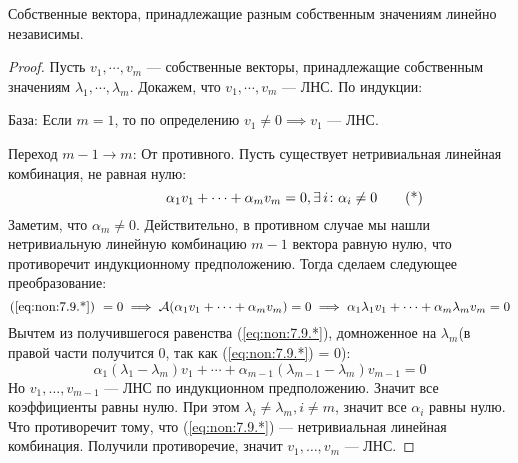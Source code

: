 \documentclass[../main.tex]{subfiles}
\begin{document}
\begin{theorem-non}
\label{non:7.9}
  Собственные вектора, принадлежащие разным собственным значениям линейно независимы.
\end{theorem-non}
\begin{proof}
  Пусть $v_1, \dotsb, v_m$ --- собственные векторы, принадлежащие собственным значениям $\lambda_1, \dotsb, \lambda_m$. Докажем, что $v_1, \dotsb, v_m$ --- ЛНС. По индукции:

  База: Если $m = 1$, то по определению $v_1 \neq 0 \implies v_1$ --- ЛНС.

  Переход $m - 1 \to m$: От противного. Пусть существует нетривиальная линейная комбинация, не равная нулю:
  \begin{equation}
  \hphantom{, \exists\, i\colon \alpha_i \neq 0}
    \alpha_1 v_1 + \dotsb + \alpha_m v_m = 0, \exists\, i\colon \alpha_i \neq 0
    \tag{*}
    \label{eq:non:7.9.*}
  \end{equation}
  Заметим, что $\alpha_m \neq 0$. Действительно, в противном случае мы нашли нетривиальную линейную комбинацию $m - 1$ вектора равную нулю, что противоречит индукционному предположению. Тогда сделаем следующее преобразование:
  \begin{equation*}
    \text{(\ref{eq:non:7.9.*}) }= 0
    \implies
    \mathcal{A}(\alpha_1 v_1 + \dotsb + \alpha_m v_m) = 0
    \implies
    \alpha_1 \lambda_1 v_1 + \dotsb + \alpha_m \lambda_m v_m = 0
  \end{equation*}
  Вычтем из получившегося равенства (\ref{eq:non:7.9.*}), домноженное на $\lambda_m$(в правой части получится 0, так как (\ref{eq:non:7.9.*}) = 0):
  \begin{equation*}
    \alpha_1(\lambda_1 - \lambda_m)v_1 + \dotsb + \alpha_{m- 1}(\lambda_{m  -1} - \lambda_m)v_{m - 1} = 0
  \end{equation*}
  Но $v_1, \dotsc, v_{m - 1}$ --- ЛНС по индукционном предположению. Значит все коэффициенты равны нулю. При этом $\lambda_i \neq \lambda_m, i \neq m$, значит все $\alpha_i$ равны нулю. Что противоречит тому, что (\ref{eq:non:7.9.*}) --- нетривиальная линейная комбинация. Получили противоречие, значит $v_1, \dotsc, v_m$ --- ЛНС.
\end{proof}
\end{document}
